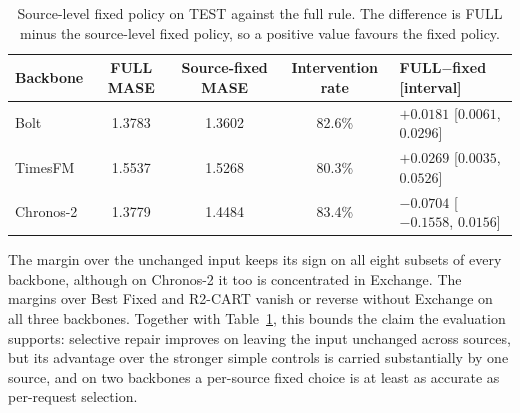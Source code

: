 \documentclass{article}
\begin{document}
\begin{table}[htbp]
\centering\small
\caption{Source-level fixed policy on TEST against the full rule. The difference is FULL
minus the source-level fixed policy, so a positive value favours the fixed policy.}
\label{tab:v53-source-fixed}
\begin{tabular}{lcccl}
\toprule
Backbone & FULL MASE & Source-fixed MASE & Intervention rate & FULL$-$fixed [interval] \\
\midrule
Bolt & 1.3783 & 1.3602 & 82.6\% & $+0.0181$ [$0.0061$, $0.0296$] \\
TimesFM & 1.5537 & 1.5268 & 80.3\% & $+0.0269$ [$0.0035$, $0.0526$] \\
Chronos-2 & 1.3779 & 1.4484 & 83.4\% & $-0.0704$ [$-0.1558$, $0.0156$] \\
\bottomrule
\end{tabular}
\end{table}

\begin{table}[htbp]
\centering\small
\caption{Leave-one-source-out on TEST: the FULL-minus-control difference in source-macro
MASE with each source removed in turn. Only the full set and the Exchange-excluded subset
are printed; the remaining seven rows per backbone move monotonically between these two
and are recorded with the result files. A negative value favours FULL.}
\label{tab:v53-loso}
\end{table}

The margin over the unchanged input keeps its sign on all eight subsets of every backbone,
although on Chronos-2 it too is concentrated in Exchange. The margins over Best Fixed and
R2-CART vanish or reverse without Exchange on all three backbones. Together with
Table~\ref{tab:v53-source-fixed}, this bounds the claim the evaluation supports: selective
repair improves on leaving the input unchanged across sources, but its advantage over the
stronger simple controls is carried substantially by one source, and on two backbones a
per-source fixed choice is at least as accurate as per-request selection.
\end{document}
